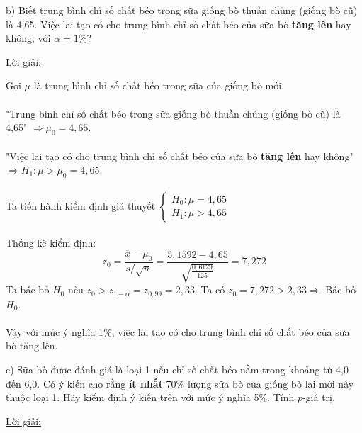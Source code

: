 \documentclass[10pt, a4paper]{article}
\begin{document}
\vspace{0.1mm}
\begin{tcolorbox}[enhanced,colback=blue!5!white,colframe=blue!75!black,sharp corners=all,shadow={0mm}{0mm}{-1.5mm}%
{fill=blue!75!red,opacity=0.3}]
\color{red}b) \color{black}Biết trung bình chỉ số chất béo trong sữa giống bò thuần chủng (giống bò cũ) là 4,65. Việc lai tạo có cho trung bình chỉ số chất béo của sữa bò \textbf{tăng lên} hay không, với $\alpha=1\%$?
\end{tcolorbox}
\begin{center}
	\color{blue}\underline{Lời giải:}
\end{center}
Gọi $\mu$ là trung bình chỉ số chất béo trong sữa của giống bò mới.\\\\
"Trung bình chỉ số chất béo trong sữa giống bò thuần chủng (giống bò cũ) là 4,65" $\Rightarrow\mu_0=4,65$.\\\\
"Việc lai tạo có cho trung bình chỉ số chất béo của sữa bò \textbf{tăng lên} hay không" $\Rightarrow H_1:\mu>\mu_0=4,65$.\\\\
Ta tiến hành kiểm định giả thuyết $\begin{cases}
	H_0:\mu=4,65\\
	H_1:\mu>4,65
\end{cases}$\\\\
Thống kê kiểm định: $$z_0=\frac{\overline x-\mu_0}{s/\sqrt n}=\frac{5,1592-4,65}{\sqrt{\frac{0,6129}{125}}}=7,272$$
Ta bác bỏ $H_0$ nếu $z_0>z_{1-\alpha}=z_{0,99}=2,33$. Ta có $z_0=7,272>2,33\Rightarrow$ Bác bỏ $H_0$.\\\\
Vậy với mức ý nghĩa 1\%, việc lai tạo có cho trung bình chỉ số chất béo của sữa bò tăng lên.
\vspace{3mm}
\begin{tcolorbox}[enhanced,colback=blue!5!white,colframe=blue!75!black,sharp corners=all,shadow={0mm}{0mm}{-1.5mm}%
{fill=blue!75!red,opacity=0.3}]
\color{red}c) \color{black}Sữa bò được đánh giá là loại 1 nếu chỉ số chất béo nằm trong khoảng từ 4,0 đến 6,0. Có ý kiến cho rằng \textbf{ít nhất} 70\% lượng sữa bò của giống bò lai mới này thuộc loại 1. Hãy kiểm định ý kiến trên với mức ý nghĩa 5\%. Tính $p$-giá trị.
\end{tcolorbox}
\begin{center}
	\color{blue}\underline{Lời giải:}
\end{center}
\end{document}
